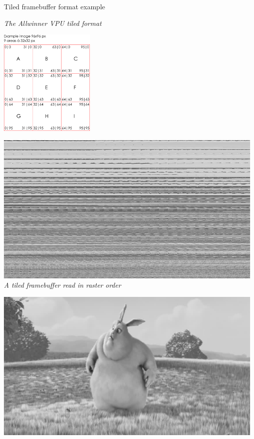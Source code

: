 \begin{frame}{Tiled framebuffer format example}
  \begin{minipage}{0.45\textwidth}
    \centering
    \textit{\small The Allwinner VPU tiled format}
  \end{minipage}
  \hfill
  \begin{minipage}{0.45\textwidth}
    \centering
    \vspace{1em}
    \includegraphics[width=0.35\textwidth]{slides/graphics-hardware/sunxi-tiled-format.png}\\
  \end{minipage}
  \vspace{2em}
  \begin{minipage}[b]{0.45\textwidth}
    \centering
    \vspace{1em}
    \includegraphics[width=\textwidth]{slides/graphics-hardware/sunxi-tiled-linear.png}
    \textit{\small A tiled framebuffer read in raster order}
  \end{minipage}
  \hfill
  \begin{minipage}[b]{0.45\textwidth}
    \centering
    \vspace{1em}
    \includegraphics[width=\textwidth]{slides/graphics-hardware/sunxi-tiled.png}

\end{minipage}
\end{frame}
